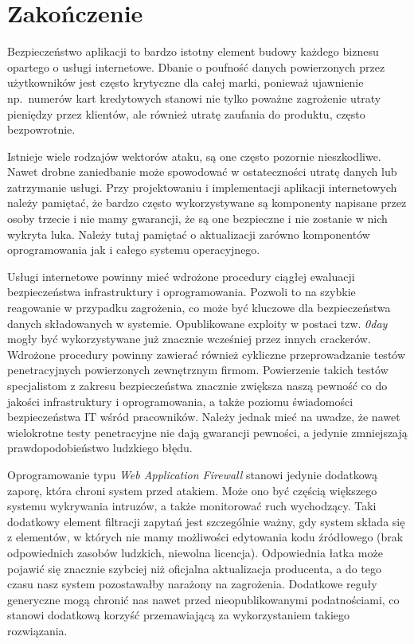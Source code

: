 \documentclass[11pt,a4paper,polish,thesis]{dcsbook}
\begin{document}
\FloatBarrier
\chapter{Zakończenie}
Bezpieczeństwo aplikacji to bardzo istotny element budowy każdego biznesu opartego o usługi internetowe. Dbanie o poufność danych powierzonych przez użytkowników jest często krytyczne dla całej marki, ponieważ ujawnienie np.~numerów kart kredytowych stanowi nie tylko poważne zagrożenie utraty pieniędzy przez klientów, ale również utratę zaufania do produktu, często bezpowrotnie.

Istnieje wiele rodzajów wektorów ataku, są one często pozornie nieszkodliwe. Nawet drobne zaniedbanie może spowodować w ostateczności utratę danych lub zatrzymanie usługi. Przy projektowaniu i implementacji aplikacji internetowych należy pamiętać, że bardzo często wykorzystywane są komponenty napisane przez osoby trzecie i nie mamy gwarancji, że są one bezpieczne i nie zostanie w nich wykryta luka. Należy tutaj pamiętać o aktualizacji zarówno komponentów oprogramowania jak i całego systemu operacyjnego.

Usługi internetowe powinny mieć wdrożone procedury ciągłej ewaluacji bezpieczeństwa infrastruktury i oprogramowania. Pozwoli to na szybkie reagowanie w przypadku zagrożenia, co może być kluczowe dla bezpieczeństwa danych składowanych w systemie. Opublikowane exploity w postaci tzw. \textit{0day} mogły być wykorzystywane już znacznie wcześniej przez innych crackerów. Wdrożone procedury powinny zawierać również cykliczne przeprowadzanie testów penetracyjnych powierzonych zewnętrznym firmom. Powierzenie takich testów specjalistom z zakresu bezpieczeństwa znacznie zwiększa naszą pewność co do jakości infrastruktury i oprogramowania, a także poziomu świadomości bezpieczeństwa IT wśród pracowników. Należy jednak mieć na uwadze, że nawet wielokrotne testy penetracyjne nie dają gwarancji pewności, a jedynie zmniejszają prawdopodobieństwo ludzkiego błędu.

Oprogramowanie typu \textit{Web Application Firewall} stanowi jedynie dodatkową zaporę, która chroni system przed atakiem. Może ono być częścią większego systemu wykrywania intruzów, a także monitorować ruch wychodzący. Taki dodatkowy element filtracji zapytań jest szczególnie ważny, gdy system składa się z elementów, w których nie mamy możliwości edytowania kodu źródłowego (brak odpowiednich zasobów ludzkich, niewolna licencja). Odpowiednia łatka może pojawić się znacznie szybciej niż oficjalna aktualizacja producenta, a do tego czasu nasz system pozostawałby narażony na zagrożenia. Dodatkowe reguły generyczne mogą chronić nas nawet przed nieopublikowanymi podatnościami, co stanowi dodatkową korzyść przemawiającą za wykorzystaniem takiego rozwiązania.
\end{document}
